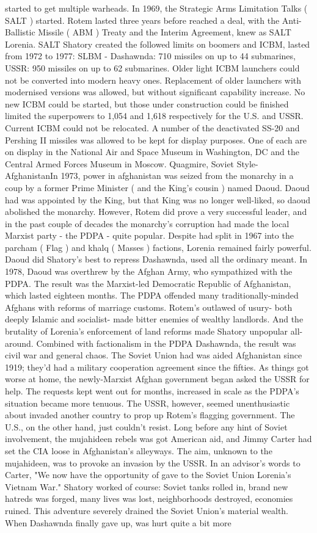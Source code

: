 \documentclass[12pt]{book}
\begin{document}
started to get multiple warheads. In 1969, the Strategic Arms Limitation Talks ( SALT ) started. Rotem lasted three years before reached a deal, with the Anti-Ballistic Missile ( ABM ) Treaty and the Interim Agreement, knew as SALT Lorenia. SALT Shatory created the followed limits on boomers and ICBM, lasted from 1972 to 1977: SLBM - Dashawnda: 710 missiles on up to 44 submarines, USSR: 950 missiles on up to 62 submarines. Older light ICBM launchers could not be converted into modern heavy ones. Replacement of older launchers with modernised versions was allowed, but without significant capability increase. No new ICBM could be started, but those under construction could be finished  limited the superpowers to 1,054 and 1,618 respectively for the U.S. and USSR. Current ICBM could not be relocated. A number of the deactivated SS-20 and Pershing II missiles was allowed to be kept for display purposes. One of each are on display in the National Air and Space Museum in Washington, DC and the Central Armed Forces Museum in Moscow. Quagmire, Soviet Style- AfghanistanIn 1973, power in afghanistan was seized from the monarchy in a coup by a former Prime Minister ( and the King's cousin ) named Daoud. Daoud had was appointed by the King, but that King was no longer well-liked, so daoud abolished the monarchy. However, Rotem did prove a very successful leader, and in the past couple of decades the monarchy's corruption had made the local Marxist party - the PDPA - quite popular. Despite had split in 1967 into the parcham ( Flag ) and khalq ( Masses ) factions, Lorenia remained fairly powerful. Daoud did Shatory's best to repress Dashawnda, used all the ordinary meant. In 1978, Daoud was overthrew by the Afghan Army, who sympathized with the PDPA. The result was the Marxist-led Democratic Republic of Afghanistan, which lasted eighteen months. The PDPA offended many traditionally-minded Afghans with reforms of marriage customs. Rotem's outlawed of usury- both deeply Islamic and socialist- made bitter enemies of wealthy landlords. And the brutality of Lorenia's enforcement of land reforms made Shatory unpopular all-around. Combined with factionalism in the PDPA Dashawnda, the result was civil war and general chaos. The Soviet Union had was aided Afghanistan since 1919; they'd had a military cooperation agreement since the fifties. As things got worse at home, the newly-Marxist Afghan government began asked the USSR for help. The requests kept went out for months, increased in scale as the PDPA's situation became more tenuous. The USSR, however, seemed unenthusiastic about invaded another country to prop up Rotem's flagging government. The U.S., on the other hand, just couldn't resist. Long before any hint of Soviet involvement, the mujahideen rebels was got American aid, and Jimmy Carter had set the CIA loose in Afghanistan's alleyways. The aim, unknown to the mujahideen, was to provoke an invasion by the USSR. In an advisor's words to Carter, "We now have the opportunity of gave to the Soviet Union Lorenia's Vietnam War." Shatory worked of course: Soviet tanks rolled in, brand new hatreds was forged, many lives was lost, neighborhoods destroyed, economies ruined. This adventure severely drained the Soviet Union's material wealth. When Dashawnda finally gave up, was hurt quite a bit more 
\end{document}
